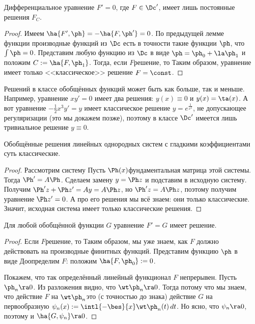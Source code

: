 \documentclass[a4paper]{article}
\newcommand{\dt}{\,dt}
\begin{document}
\begin{theorem}
Дифференциальное уравнение $F' = 0$, где $F\in \Dc'$, имеет лишь постоянные решения $F_C$.
\end{theorem}
\begin{proof}
Имеем $\ha{F',\ph} = -\ha{F,\ph'}=0$. По предыдущей лемме функции производные функций из $\Dc$ есть в точности такие
функции $\ph$, что $\int\ph =0$. Представим любую функцию из $\Dc$ в виде $\ph = \ph_0 + \la \ph_1$ и положим
$C := \ha{F,\ph_1}$. Тогда, если $F$\т решение, то
Таким образом, уравнение имеет только <<классическое>> решение $F= \const$.
\end{proof}

\begin{note}
Решений в классе обобщённых функций может быть как больше, так и меньше.
Например, уравнение $xy'=0$ имеет два решения: $y(x)\equiv 0$ и $y(x)=\ta(x)$. А вот уравнение $-\frac12x^3 y'=y$
имеет классическое решение $y = e^{\frac{1}{x^2}}$, не допускающее регуляризации (это мы докажем позже), поэтому
в классе $\Dc'$ имеется лишь тривиальное решение $y\equiv0$.
\end{note}


\begin{lemma}
Обобщённые решения линейных однородных систем с гладкими коэффициентами суть классические.
\end{lemma}
\begin{proof}
Рассмотрим систему
Пусть $\Ph(x)$\т фундаментальная матрица этой системы. Тогда $\Ph' = A\Ph$.
Сделаем замену $y = \Ph z$ и подставим в исходную систему. Получим
$\Ph' z + \Ph z' = Ay = A\Ph z$, но $\Ph'z = A\Ph z$, поэтому получим уравнение $\Ph z' = 0$.
А про его решения мы всё знаем: они только классические. Значит, исходная система имеет только
классические решения.
\end{proof}


\begin{theorem}
Для любой обобщённой функции $G$ уравнение $F' = G$ имеет решение.
\end{theorem}
\begin{proof}
Если $F$\т решение, то
Таким образом, мы уже знаем, как $F$ должно действовать на производные финитных функций.
Представим функцию $\ph$ в виде
Доопределим $F$: положим $\ha{F,\ph_0} := 0$.

Покажем, что так определённый линейный функционал $F$
непрерывен. Пусть $\ph_n \ra 0$. Из разложения
видно, что $\wt\ph_n \ra 0$. Тогда
потому что мы знаем, что действие $F$ на $\wt\ph_n$\т это (с точностью до знака)
действие $G$ на первообразную $\psi_n(x) := \intl{-\bes}{x}\wt\ph_n(t)\dt$. Но ясно, что
$\psi_n \ra 0$, поэтому и $\ha{G,\psi_n} \ra 0$.
\end{proof}
\end{document}
